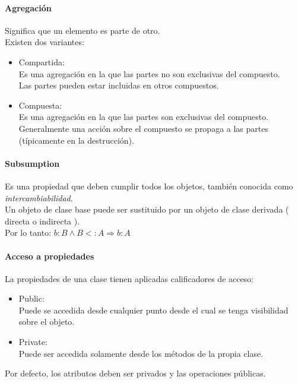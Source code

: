 \documentclass[a4paper,12pt,oneside]{report}
\begin{document}
        \paragraph{Agregaci\'on}
          Significa que un elemento es parte de otro.\\
          Existen dos variantes:
          \begin{itemize}
            \item Compartida:\\
                    Es una agregaci\'on en la que las partes no son exclusivas del
                    compuesto.\\
                    Las partes pueden estar incluidas en otros compuestos.
            \item Compuesta:\\
                    Es una agregaci\'on en la que las partes son exclusivas del
                    compuesto.\\
                    Generalmente una acci\'on sobre el compuesto se propaga a las
                    partes (t\'ipicamente en la destrucci\'on).
          \end{itemize}

        \paragraph{Subsumption}
          Es una propiedad que deben cumplir todos los objetos, tambi\'en conocida
          como \emph{intercambiabilidad}.\\
          Un objeto de clase base puede ser sustituido por un objeto de clase derivada
          ( directa o indirecta ).\\
          Por lo tanto: $b:B \wedge B<:A \Longrightarrow b:A$

        \paragraph{Acceso a propiedades}
          La propiedades de una clase tienen aplicadas calificadores de acceso:
          \begin{itemize}
            \item Public:\\
                    Puede se accedida desde cualquier punto desde el cual se tenga
                    visibilidad sobre el objeto.
            \item Private:\\
                    Puede ser accedida solamente desde los m\'etodos de la propia clase.
          \end{itemize}
          Por defecto, los atributos deben ser privados y las operaciones p\'ublicas.
\end{document}
